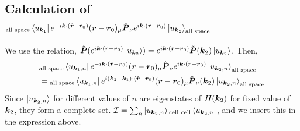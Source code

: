 \documentclass{report}
\renewcommand\vec[1]{\ensuremath\boldsymbol{#1}} %
\begin{document}
\subsection{Calculation of ${}_{\text{all space}}\bra{ u_{\vec{k}_1}} e^{-i \vec{k}\cdot(\hat{\vec{r}} - \vec{r}_0)} (\vec{r} - \vec{r}_0)_\mu \hat{\vec{P}}_\nu e^{i \vec{k}\cdot(\vec{r} - \vec{r}_0)} \ket{u_{\vec{k}_2}}_{\text{all space}}$}
We use the relation, $\hat{\vec{P}} (e^{i \vec{k}\cdot(\vec{r} - \vec{r}_0)} \ket{u_{\vec{k}_2}}) = e^{i \vec{k}\cdot(\vec{r} - \vec{r}_0)} \tilde{\vec{P}}(\vec{k}_2) \ket{u_{\vec{k}_2}}$.
Then,
$$
\begin{aligned}
	& {}_{\text{all space}}\bra{ u_{\vec{k}_1,n}} e^{-i \vec{k}\cdot(\hat{\vec{r}} - \vec{r}_0)} (\vec{r} - \vec{r}_0)_\mu \hat{\vec{P}}_\nu e^{i \vec{k}\cdot(\vec{r} - \vec{r}_0)} \ket{u_{\vec{k}_2,n}}_{\text{all space}} \\
	&= {}_{\text{all space}}\bra{ u_{\vec{k}_1,n}} e^{i (\vec{k}_2 - \vec{k}_1)\cdot(\hat{\vec{r}} - \vec{r}_0)} (\vec{r} - \vec{r}_0)_\mu \tilde{\vec{P}}_\nu (\vec{k}_2) \ket{u_{\vec{k}_2,n}}_{\text{all space}}
\end{aligned}
$$
Since $\ket{u_{\vec{k}_2, n}}$ for different values of $n$ are eigenstates of $H(\vec{k}_2)$ for fixed value of $\vec{k}_2$, they form a complete set. $\mathcal{I} = \sum_n \ket{u_{\vec{k}_2, n}} {}_{\text{cell }}  {}_{\text{cell}}\bra{u_{\vec{k}_2, n}}$, and we insert this in the expression above.
\end{document}

